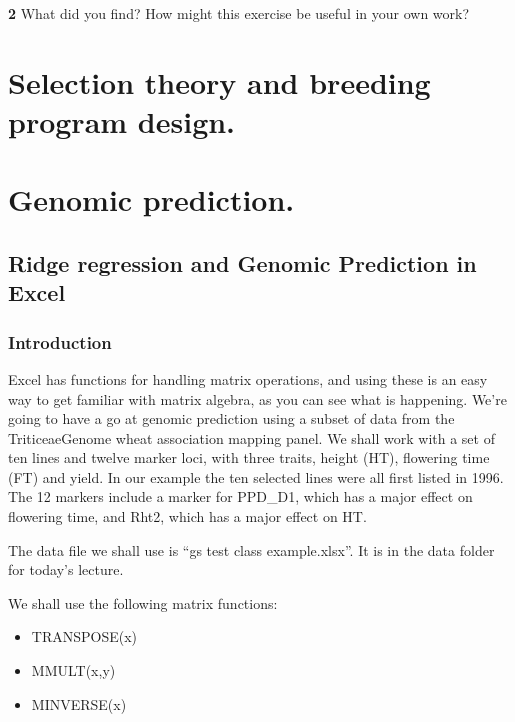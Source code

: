 \documentclass[
]{book}
\makeatletter
\providecommand{\tightlist}{%
  \setlength{\itemsep}{0pt}\setlength{\parskip}{0pt}}
\newenvironment{kframe}{%
\medskip{}
\setlength{\fboxsep}{.8em}
 \def\at@end@of@kframe{}%
 \ifinner\ifhmode%
  \def\at@end@of@kframe{\end{minipage}}%
  \begin{minipage}{\columnwidth}%
 \fi\fi%
 \def\FrameCommand##1{\hskip\@totalleftmargin \hskip-\fboxsep
 \colorbox{shadecolor}{##1}\hskip-\fboxsep
     \hskip-\linewidth \hskip-\@totalleftmargin \hskip\columnwidth}%
 \MakeFramed {\advance\hsize-\width
   \@totalleftmargin\z@ \linewidth\hsize
   \@setminipage}}%
 {\par\unskip\endMakeFramed%
 \at@end@of@kframe}
\newenvironment{rmdblock}[1]
  {
  \begin{itemize}
  \renewcommand{\labelitemi}{
    \raisebox{-.7\height}[0pt][0pt]{
      {\setkeys{Gin}{width=3em,keepaspectratio}\texttt{[image: images/\#1]}}
    }
  }
  \setlength{\fboxsep}{1em}
  \begin{kframe}
  \item
  }
  {
  \end{kframe}
  \end{itemize}
  }
\newenvironment{rmdquiz}
  {\begin{rmdblock}{quiz}}
  {\end{rmdblock}}
\makeatother
\begin{document}
\begin{rmdquiz}
\textbf{2}
What did you find? How might this exercise be useful in your own work?
\end{rmdquiz}

\hypertarget{selection-theory}{%
\chapter{Selection theory and breeding program design.}\label{selection-theory}}

\hypertarget{Genomic-prediction}{%
\chapter{Genomic prediction.}\label{Genomic-prediction}}

\hypertarget{ridge-regression-and-genomic-prediction-in-excel}{%
\section{Ridge regression and Genomic Prediction in Excel}\label{ridge-regression-and-genomic-prediction-in-excel}}

\hypertarget{introduction-4}{%
\subsection{Introduction}\label{introduction-4}}

Excel has functions for handling matrix operations, and using these is an easy way to get familiar with matrix algebra, as you can see what is happening. We're going to have a go at genomic prediction using a subset of data from the TriticeaeGenome wheat association mapping panel. We shall work with a set of ten lines and twelve marker loci, with three traits, height (HT), flowering time (FT) and yield. In our example the ten selected lines were all first listed in 1996. The 12 markers include a marker for PPD\_D1, which has a major effect on flowering time, and Rht2, which has a major effect on HT.

The data file we shall use is ``gs test class example.xlsx''. It is in the data folder for today's lecture.

We shall use the following matrix functions:

\begin{itemize}
\tightlist
\item
  TRANSPOSE(x)
\item
  MMULT(x,y)
\item
  MINVERSE(x)
\end{itemize}
\end{document}
